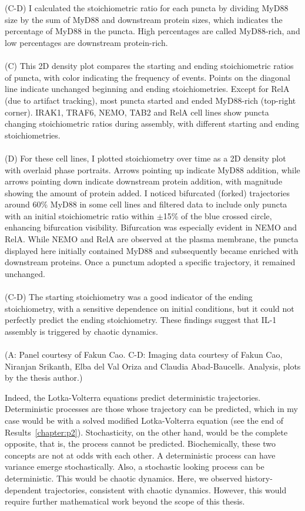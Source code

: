 \begin{centering}
{\\
\\
(C-D) I calculated the stoichiometric ratio for each puncta by dividing MyD88 size by the sum of MyD88 and downstream protein sizes, which indicates the percentage of MyD88 in the puncta. High percentages are called MyD88-rich, and low percentages are downstream protein-rich.
\\
\\
(C) This 2D density plot compares the starting and ending stoichiometric ratios of puncta, with color indicating the frequency of events. Points on the diagonal line indicate unchanged beginning and ending stoichiometries. Except for RelA (due to artifact tracking), most puncta started and ended MyD88-rich (top-right corner). IRAK1, TRAF6, NEMO, TAB2 and RelA cell lines show puncta changing stoichiometric ratios during assembly, with different starting and ending stoichiometries.
\\
\\
(D) For these cell lines, I plotted stoichiometry over time as a 2D density plot with overlaid phase portraits. Arrows pointing up indicate MyD88 addition, while arrows pointing down indicate downstream protein addition, with magnitude showing the amount of protein added. I noticed bifurcated (forked) trajectories around 60\% MyD88 in some cell lines and filtered data to include only puncta with an initial stoichiometric ratio within $\pm$15\% of the blue crossed circle, enhancing bifurcation visibility. Bifurcation was especially evident in NEMO and RelA. While NEMO and RelA are observed at the plasma membrane, the puncta displayed here initially contained MyD88 and subsequently became enriched with downstream proteins. Once a punctum adopted a specific trajectory, it remained unchanged.
\\
\\
(C-D) The starting stoichiometry was a good indicator of the ending stoichiometry, with a sensitive dependence on initial conditions, but it could not perfectly predict the ending stoichiometry. These findings suggest that IL-1 assembly is triggered by chaotic dynamics.
\\
\\
(A: Panel courtesy of Fakun Cao. C-D: Imaging data courtesy of Fakun Cao, Niranjan Srikanth, Elba del Val Oriza and Claudia Abad-Baucells. Analysis, plots by the thesis author.)}
\label{p3:1}
\end{centering}

Indeed, the Lotka-Volterra equations predict deterministic trajectories. Deterministic processes are those whose trajectory can be predicted, which in my case would be with a solved modified Lotka-Volterra equation (see the end of Results~\ref{chapter:p2}). Stochasticity, on the other hand, would be the complete opposite, that is, the process cannot be predicted. Biochemically, these two concepts are not at odds with each other. A deterministic process can have variance emerge stochastically. Also, a stochastic looking process can be deterministic. This would be chaotic dynamics. Here, we observed history-dependent trajectories, consistent with chaotic dynamics. However, this would require further mathematical work beyond the scope of this thesis.

